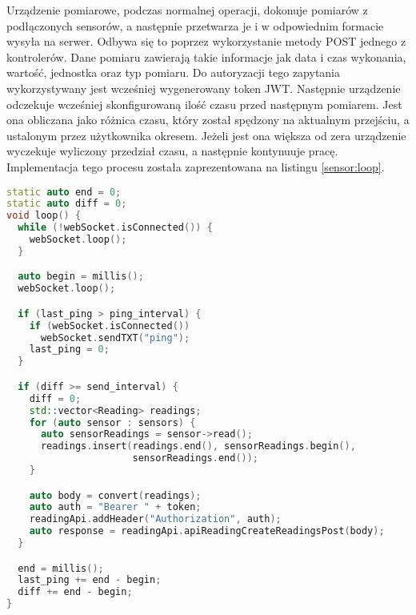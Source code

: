Urządzenie pomiarowe, podczas normalnej operacji, dokonuje pomiarów z podłączonych sensorów, 
a następnie przetwarza je i w odpowiednim formacie wysyła na serwer. Odbywa się to poprzez
wykorzystanie metody POST jednego z kontrolerów. Dane pomiaru zawierają takie informacje jak
data i czas wykonania, wartość, jednostka oraz typ pomiaru. Do autoryzacji tego zapytania
wykorzystywany jest wcześniej wygenerowany token JWT. Następnie urządzenie odczekuje wcześniej
skonfigurowaną ilość czasu przed następnym pomiarem. Jest ona obliczana jako różnica czasu, który
został spędzony na aktualnym przejściu, a ustalonym przez użytkownika okresem. Jeżeli jest ona
większa od zera urządzenie wyczekuje wyliczony przedział czasu, a następnie kontynuuje pracę.
Implementacja tego procesu została zaprezentowana na listingu \ref{sensor:loop}.
\begin{lstlisting}[language={C++},caption={Główna pętla urządzenia pomiarowego},label={sensor:loop},captionpos=b]
static auto end = 0;
static auto diff = 0;
void loop() {
  while (!webSocket.isConnected()) {
    webSocket.loop();
  }

  auto begin = millis();
  webSocket.loop();

  if (last_ping > ping_interval) {
    if (webSocket.isConnected())
      webSocket.sendTXT("ping");
    last_ping = 0;
  }

  if (diff >= send_interval) {
    diff = 0;
    std::vector<Reading> readings;
    for (auto sensor : sensors) {
      auto sensorReadings = sensor->read();
      readings.insert(readings.end(), sensorReadings.begin(),
                      sensorReadings.end());
    }

    auto body = convert(readings);
    auto auth = "Bearer " + token;
    readingApi.addHeader("Authorization", auth);
    auto response = readingApi.apiReadingCreateReadingsPost(body);
  }

  end = millis();
  last_ping += end - begin;
  diff += end - begin;
}
\end{lstlisting}

